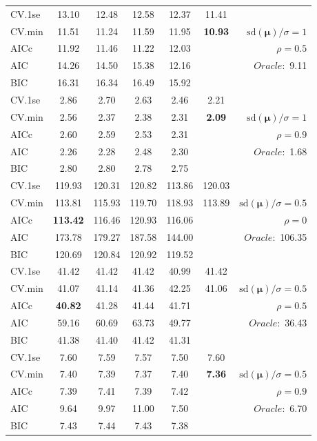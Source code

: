 \begin{table}
\begin{center}
\begin{tabular}{l*{5}{c}|r}
 \hline 
CV.1se & 13.10 & 12.48 & 12.58 & 12.37 & 11.41 & \\
CV.min & 11.51 & 11.24 & 11.59 & 11.95 & {\bf 10.93} &  $\mathrm{sd}(\mathbf{\mu})/\sigma=1$ \\
AICc & 11.92 & 11.46 & 11.22 & 12.03 & & $\rho=0.5$ \\
AIC & 14.26 & 14.50 & 15.38 & 12.16 & &  \multirow{2}{*}{$Oracle: $ 9.11} \\
BIC & 16.31 & 16.34 & 16.49 & 15.92 & &  \\
 \hline 
CV.1se & 2.86 & 2.70 & 2.63 & 2.46 & 2.21 & \\
CV.min & 2.56 & 2.37 & 2.38 & 2.31 & {\bf 2.09} &  $\mathrm{sd}(\mathbf{\mu})/\sigma=1$ \\
AICc & 2.60 & 2.59 & 2.53 & 2.31 & & $\rho=0.9$ \\
AIC & 2.26 & 2.28 & 2.48 & 2.30 & &  \multirow{2}{*}{$Oracle: $ 1.68} \\
BIC & 2.80 & 2.80 & 2.78 & 2.75 & &  \\
 \hline 
CV.1se & 119.93 & 120.31 & 120.82 & 113.86 & 120.03 & \\
CV.min & 113.81 & 115.93 & 119.70 & 118.93 & 113.89 &  $\mathrm{sd}(\mathbf{\mu})/\sigma=0.5$ \\
AICc & {\bf 113.42} & 116.46 & 120.93 & 116.06 & & $\rho=0$ \\
AIC & 173.78 & 179.27 & 187.58 & 144.00 & &  \multirow{2}{*}{$Oracle: $ 106.35} \\
BIC & 120.69 & 120.84 & 120.92 & 119.52 & &  \\
 \hline 
CV.1se & 41.42 & 41.42 & 41.42 & 40.99 & 41.42 & \\
CV.min & 41.07 & 41.14 & 41.36 & 42.25 & 41.06 &  $\mathrm{sd}(\mathbf{\mu})/\sigma=0.5$ \\
AICc & {\bf 40.82} & 41.28 & 41.44 & 41.71 & & $\rho=0.5$ \\
AIC & 59.16 & 60.69 & 63.73 & 49.77 & &  \multirow{2}{*}{$Oracle: $ 36.43} \\
BIC & 41.38 & 41.40 & 41.42 & 41.31 & &  \\
 \hline 
CV.1se & 7.60 & 7.59 & 7.57 & 7.50 & 7.60 & \\
CV.min & 7.40 & 7.39 & 7.37 & 7.40 & {\bf 7.36} &  $\mathrm{sd}(\mathbf{\mu})/\sigma=0.5$ \\
AICc & 7.39 & 7.41 & 7.39 & 7.42 & & $\rho=0.9$ \\
AIC & 9.64 & 9.97 & 11.00 & 7.50 & &  \multirow{2}{*}{$Oracle: $ 6.70} \\
BIC & 7.43 & 7.44 & 7.43 & 7.38 & &  \\
 \hline 
\end{tabular}
\end{center}
\vspace{-1cm}
\end{table}




